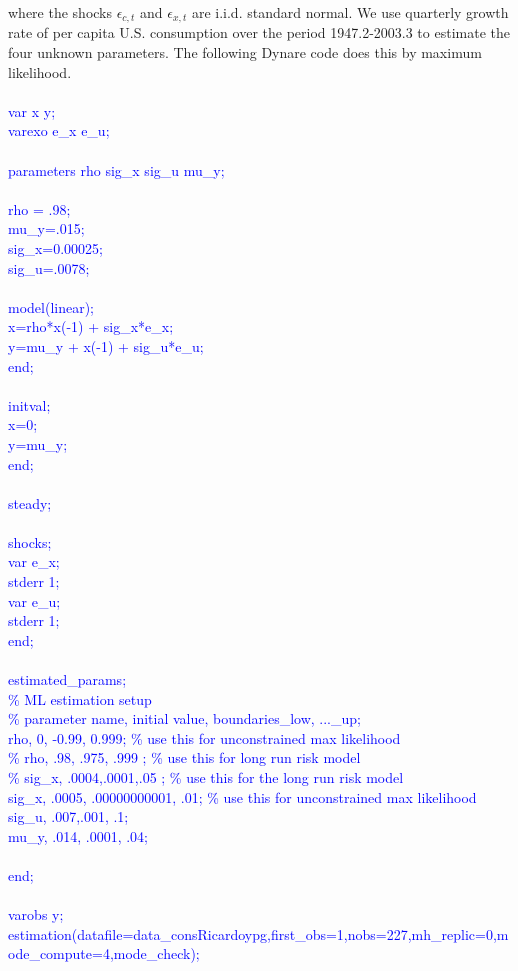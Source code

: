 \documentclass[a4paper,12pt]{scrartcl} %
\begin{document}
where the shocks $\epsilon_{c,t}$ and $\epsilon_{x,t}$ are i.i.d. standard normal. We use quarterly growth rate of per capita U.S. consumption over the period 1947.2-2003.3 to estimate the four unknown parameters. The following Dynare code does this by maximum likelihood.\\
\\
\textcolor{blue}{
var x y;\\
varexo e\_x e\_u;\\
\\
parameters  rho sig\_x sig\_u mu\_y;\\
\\
rho = .98;\\
mu\_y=.015;\\
sig\_x=0.00025;\\
sig\_u=.0078;\\
\\
model(linear);\\
x=rho*x(-1) + sig\_x*e\_x;\\
y=mu\_y + x(-1) + sig\_u*e\_u;\\
end;\\
\\
initval;\\
x=0;\\
y=mu\_y;\\
end;\\
\\
steady;\\
\\
shocks;\\
var e\_x;\\
stderr 1;\\
var e\_u;\\
stderr 1;\\
end;\\
\\
estimated\_params;\\
\% ML estimation setup\\
\% parameter name, initial value, boundaries\_low, ...\_up;\\
 rho, 0, -0.99, 0.999;  \% use this for unconstrained max likelihood\\
\% rho, .98, .975, .999 ;  \% use this for long run risk model\\
\% sig\_x, .0004,.0001,.05 ; \% use this for the long run risk model\\
sig\_x, .0005, .00000000001, .01;  \% use this for unconstrained max likelihood\\
sig\_u, .007,.001, .1;\\
mu\_y, .014, .0001, .04;\\
\\
end;\\
\\
varobs y;\\
estimation(datafile=data\_consRicardoypg,first\_obs=1,nobs=227,mh\_replic=0,mode\_compute=4,mode\_check);}\\
\end{document}
